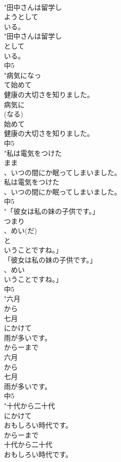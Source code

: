 \documentclass[8pt]{extreport}
\begin{document}
\begin{CJK}{UTF8}{min}
\\	"田中さんは留学し
\\	ようとして
\\	いる。
\\	"田中さんは留学し
\\	として
\\	いる。
\\	中5
\\	"病気になっ
\\	て始めて
\\	健康の大切さを知りました。
\\	病気に
\\	(なる)
\\	始めて
\\	健康の大切さを知りました。
\\	中5
\\	"私は電気をつけた
\\	まま
\\	、いつの間にか眠ってしまいました。
\\	私は電気をつけた
\\	、いつの間にか眠ってしまいました。
\\	中5
\\	"「彼女は私の妹の子供です。」
\\	つまり
\\	、めい(だ)
\\	と
\\	いうことですね。」
\\	「彼女は私の妹の子供です。」
\\	、めい
\\	いうことですね。」
\\	中5
\\	"六月
\\	から
\\	七月
\\	にかけて
\\	雨が多いです。
\\	からーまで 
\\	六月
\\	から
\\	七月
\\	雨が多いです。
\\	中5
\\	"十代から二十代
\\	にかけて
\\	おもしろい時代です。
\\	からーまで 
\\	十代から二十代
\\	おもしろい時代です。

\end{CJK}
\end{document}
